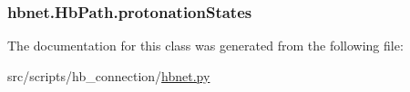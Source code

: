 \hypertarget{classhbnet_1_1_hb_path_a68abdff4f3379feafefde52a57c63f62}{
\subsubsection[{protonation\-States}]{\setlength{\rightskip}{0pt plus 5cm}hbnet.\-Hb\-Path.\-protonation\-States}}\label{classhbnet_1_1_hb_path_a68abdff4f3379feafefde52a57c63f62}


The documentation for this class was generated from the following file\-:\begin{DoxyCompactItemize}
\item 
src/scripts/hb\-\_\-connection/\hyperlink{hbnet_8py}{hbnet.\-py}\end{DoxyCompactItemize}

